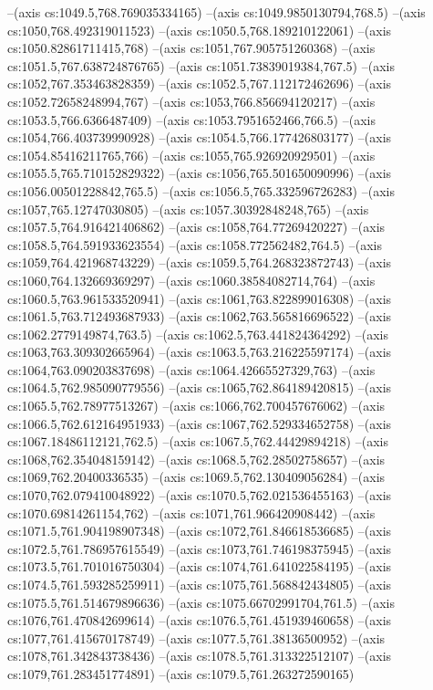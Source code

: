 --(axis cs:1049.5,768.769035334165)
--(axis cs:1049.9850130794,768.5)
--(axis cs:1050,768.492319011523)
--(axis cs:1050.5,768.189210122061)
--(axis cs:1050.82861711415,768)
--(axis cs:1051,767.905751260368)
--(axis cs:1051.5,767.638724876765)
--(axis cs:1051.73839019384,767.5)
--(axis cs:1052,767.353463828359)
--(axis cs:1052.5,767.112172462696)
--(axis cs:1052.72658248994,767)
--(axis cs:1053,766.856694120217)
--(axis cs:1053.5,766.6366487409)
--(axis cs:1053.7951652466,766.5)
--(axis cs:1054,766.403739990928)
--(axis cs:1054.5,766.177426803177)
--(axis cs:1054.85416211765,766)
--(axis cs:1055,765.926920929501)
--(axis cs:1055.5,765.710152829322)
--(axis cs:1056,765.501650090996)
--(axis cs:1056.00501228842,765.5)
--(axis cs:1056.5,765.332596726283)
--(axis cs:1057,765.12747030805)
--(axis cs:1057.30392848248,765)
--(axis cs:1057.5,764.916421406862)
--(axis cs:1058,764.77269420227)
--(axis cs:1058.5,764.591933623554)
--(axis cs:1058.772562482,764.5)
--(axis cs:1059,764.421968743229)
--(axis cs:1059.5,764.268323872743)
--(axis cs:1060,764.132669369297)
--(axis cs:1060.38584082714,764)
--(axis cs:1060.5,763.961533520941)
--(axis cs:1061,763.822899016308)
--(axis cs:1061.5,763.712493687933)
--(axis cs:1062,763.565816696522)
--(axis cs:1062.2779149874,763.5)
--(axis cs:1062.5,763.441824364292)
--(axis cs:1063,763.309302665964)
--(axis cs:1063.5,763.216225597174)
--(axis cs:1064,763.090203837698)
--(axis cs:1064.42665527329,763)
--(axis cs:1064.5,762.985090779556)
--(axis cs:1065,762.864189420815)
--(axis cs:1065.5,762.78977513267)
--(axis cs:1066,762.700457676062)
--(axis cs:1066.5,762.612164951933)
--(axis cs:1067,762.529334652758)
--(axis cs:1067.18486112121,762.5)
--(axis cs:1067.5,762.44429894218)
--(axis cs:1068,762.354048159142)
--(axis cs:1068.5,762.28502758657)
--(axis cs:1069,762.20400336535)
--(axis cs:1069.5,762.130409056284)
--(axis cs:1070,762.079410048922)
--(axis cs:1070.5,762.021536455163)
--(axis cs:1070.69814261154,762)
--(axis cs:1071,761.966420908442)
--(axis cs:1071.5,761.904198907348)
--(axis cs:1072,761.846618536685)
--(axis cs:1072.5,761.786957615549)
--(axis cs:1073,761.746198375945)
--(axis cs:1073.5,761.701016750304)
--(axis cs:1074,761.641022584195)
--(axis cs:1074.5,761.593285259911)
--(axis cs:1075,761.568842434805)
--(axis cs:1075.5,761.514679896636)
--(axis cs:1075.66702991704,761.5)
--(axis cs:1076,761.470842699614)
--(axis cs:1076.5,761.451939460658)
--(axis cs:1077,761.415670178749)
--(axis cs:1077.5,761.38136500952)
--(axis cs:1078,761.342843738436)
--(axis cs:1078.5,761.313322512107)
--(axis cs:1079,761.283451774891)
--(axis cs:1079.5,761.263272590165)
